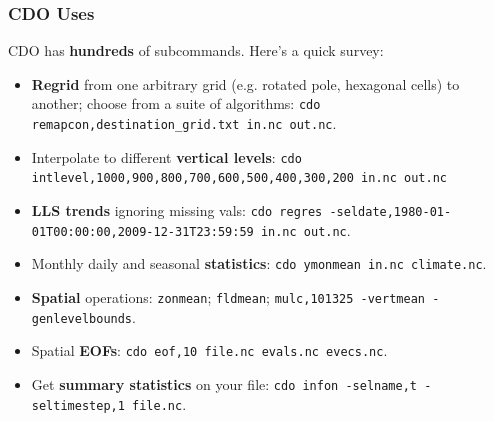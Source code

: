 \documentclass[aspectratio=169]{beamer}
\begin{document}
\begin{frame}
  \frametitle{CDO Uses}

  CDO has \textbf{hundreds} of subcommands. Here's a quick survey:
  \begin{itemize}
    \item \textbf{Regrid} from one arbitrary grid (e.g. rotated pole, hexagonal cells) to another; choose from a suite of algorithms: \texttt{cdo remapcon,destination\_grid.txt in.nc out.nc}.
    \pause
    \item Interpolate to different \textbf{vertical levels}: \texttt{cdo intlevel,1000,900,800,700,600,500,400,300,200 in.nc out.nc}
    \pause
    \item \textbf{LLS trends} ignoring missing vals: \texttt{cdo regres -seldate,1980-01-01T00:00:00,2009-12-31T23:59:59 in.nc out.nc}.
    \pause
    \item Monthly daily and seasonal \textbf{statistics}: \texttt{cdo ymonmean in.nc climate.nc}.
    \pause
    \item \textbf{Spatial} operations: \texttt{zonmean}; \texttt{fldmean}; \texttt{mulc,101325 -vertmean -genlevelbounds}.
    \pause
    \item Spatial \textbf{EOFs}: \texttt{cdo eof,10 file.nc evals.nc evecs.nc}.
    \pause
    \item Get \textbf{summary statistics} on your file: \texttt{cdo infon -selname,t -seltimestep,1 file.nc}.
  \end{itemize}
\end{frame}
\end{document}

